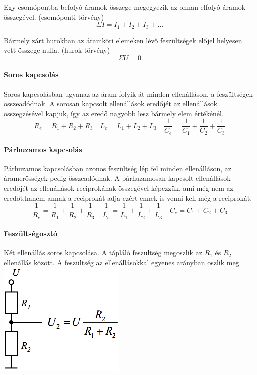 \begin{theorem}
	Egy csomópontba befolyó áramok összege megegyezik az onnan elfolyó áramok összegével. (csomóponti törvény) $$ \Sigma I = I_1 + I_2 + I_3 + \dots$$
\end{theorem}

\begin{theorem}
	Bármely zárt hurokban az áramköri elemeken lévő feszültségek előjel helyesen vett összege nulla. (hurok törvény) $$ \Sigma U = 0 $$
\end{theorem}

\paragraph{Soros kapcsolás}
Soros kapcsolásban ugyanaz az áram folyik át minden ellenálláson, a feszültségek
összeadódnak. A sorosan kapcsolt ellenállások eredőjét az ellenállások összegzésével kapjuk, így az eredő nagyobb lesz bármely elem értékénél.
$$R_e = R_1 + R_2 + R_3\quad 
L_e = L_1 + L_2 + L_3\quad 
\frac{1}{C_e} = \frac{1}{C_1} + \frac{1}{C_2} + \frac{1}{C_3}$$

\paragraph{Párhuzamos kapcsolás}
Párhuzamos kapcsolásban azonos feszültség lép fel minden ellenálláson, az áramerősségek pedig összeadódnak. A párhuzamosan kapcsolt ellenállások eredőjét az ellenállások reciprokának összegével képezzük, ami még nem az eredőt,hanem annak a reciprokát adja ezért ennek is venni kell még a reciprokát.
$$\frac{1}{R_e} = \frac{1}{R_1} + \frac{1}{R_2} + \frac{1}{R_3}\quad \frac{1}{L_e} = \frac{1}{L_1} + \frac{1}{L_2} + \frac{1}{L_3}\quad 
C_e = C_1 + C_2 + C_3$$

\paragraph{Feszültségosztó}
Két ellenállás soros kapcsolása. A tápláló feszültség megoszlik az $R_1$ és $R_2$ ellenállás között. A feszültség az ellenállásokkal egyenes arányban oszlik meg.\\ %
\includegraphics[width=0.25\linewidth]{fig/10-voltage_divider}

